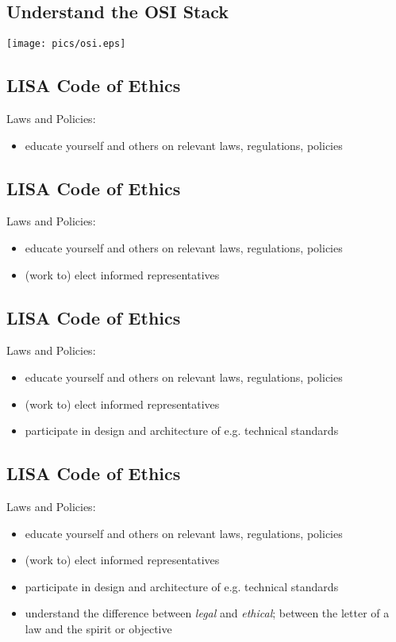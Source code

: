\documentclass[xga]{xdvislides}
\begin{document}
\subsection{Understand the OSI Stack}
\vspace*{\fill}
\begin{center}
	\texttt{[image: pics/osi.eps]}
\end{center}
\vspace*{\fill}

\subsection{LISA Code of Ethics}
Laws and Policies:
\begin{itemize}
	\item educate yourself and others on relevant laws, regulations, policies
\end{itemize}

\subsection{LISA Code of Ethics}
Laws and Policies:
\begin{itemize}
	\item educate yourself and others on relevant laws, regulations, policies
	\item (work to) elect informed representatives
\end{itemize}

\subsection{LISA Code of Ethics}
Laws and Policies:
\begin{itemize}
	\item educate yourself and others on relevant laws, regulations, policies
	\item (work to) elect informed representatives
	\item participate in design and architecture of e.g. technical standards
\end{itemize}

\subsection{LISA Code of Ethics}
Laws and Policies:
\begin{itemize}
	\item educate yourself and others on relevant laws, regulations, policies
	\item (work to) elect informed representatives
	\item participate in design and architecture of e.g. technical standards
	\item understand the difference between {\em
legal} and {\em ethical}; between the letter of a law
and the spirit or objective
\end{itemize}
\end{document}
